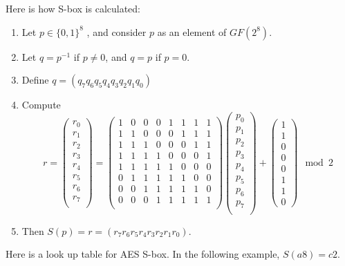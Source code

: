 \documentclass[12pt,titlepage]{article}
\begin{document}
Here is how S-box is calculated: \begin{enumerate}
\item Let $p \in \{0,1\}^8$ , and consider $p$ as an element of $GF(2^8)$.
\item Let $q = p^{-1}$ if $p \neq 0$, and $q = p$ if $p = 0$.
\item Define $q = (q_7q_6q_5q_4q_3q_2q_1q_0)$
\item Compute $$r=\begin{pmatrix}
r_0\\r_1\\r_2\\r_3\\r_4\\r_5\\r_6\\r_7\\
\end{pmatrix} = \begin{pmatrix}
1&0&0&0&1&1&1&1\\
1&1&0&0&0&1&1&1\\
1&1&1&0&0&0&1&1\\
1&1&1&1&0&0&0&1\\
1&1&1&1&1&0&0&0\\
0&1&1&1&1&1&0&0\\
0&0&1&1&1&1&1&0\\
0&0&0&1&1&1&1&1\\
\end{pmatrix} \begin{pmatrix}
p_0\\p_1\\p_2\\p_3\\p_4\\p_5\\p_6\\p_7\\
\end{pmatrix} + \begin{pmatrix}
1\\1\\0\\0\\0\\1\\1\\0
\end{pmatrix} \mod 2$$
\item Then $S(p) = r = (r_7 r_6 r_5 r_4 r_3 r_2 r_1 r_0)$.
\end{enumerate}
Here is a look up table for AES S-box. In the following example, $S(a8) = c2$. 
\end{document}
